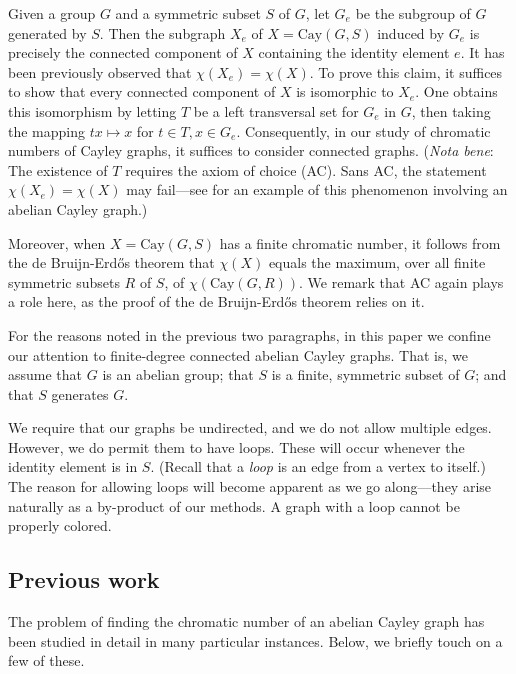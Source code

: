 \documentclass{article}
\theoremstyle{definition}
\theoremstyle{remark}
\begin{document}
Given a group $G$ and a symmetric subset $S$ of $G$, let $G_e$ be the subgroup of $G$ generated by $S$.  Then the subgraph $X_e$ of $X=\text{Cay}(G,S)$ induced by $G_e$ is precisely the connected component of $X$ containing the identity element $e$.  It has been previously observed that $\chi(X_e)=\chi(X)$.  To prove this claim, it suffices to show that every connected component of $X$ is isomorphic to $X_e$.  One obtains this isomorphism by letting $T$ be a left transversal set for $G_e$ in $G$, then taking the mapping $tx\mapsto x$ for $t\in T, x\in G_e$.  Consequently, in our study of chromatic numbers of Cayley graphs, it suffices to consider connected graphs.  (\emph{Nota bene}: The existence of $T$ requires the axiom of choice (AC).  Sans AC, the statement $\chi(X_e)=\chi(X)$ may fail---see \cite{Shelah-Soifer} for an example of this phenomenon involving an abelian Cayley graph.)

Moreover, when $X=\text{Cay}(G,S)$ has a finite chromatic number, it follows from the de Bruijn-Erd\H{o}s theorem \cite{de-Bruijn-Erdos} that $\chi(X)$ equals the maximum, over all finite symmetric subsets $R$ of $S$, of $\chi(\text{Cay}(G,R))$.  We remark that AC again plays a role here, as the proof of the de Bruijn-Erd\H{o}s theorem relies on it.

For the reasons noted in the previous two paragraphs, in this paper we confine our attention to finite-degree connected abelian Cayley graphs.  That is, we assume that $G$ is an abelian group; that $S$ is a finite, symmetric subset of $G$; and that $S$ generates $G$.

\vspace{.1in}

We require that our graphs be undirected, and we do not allow multiple edges.  However, we do permit them to have loops.  These will occur whenever the identity element is in $S$.  (Recall that a \emph{loop} is an edge from a vertex to itself.)  The reason for allowing loops will become apparent as we go along---they arise naturally as a by-product of our methods.  A graph with a loop cannot be properly colored.

\subsection{Previous work}

The problem of finding the chromatic number of an abelian Cayley graph has been studied in detail in many particular instances.  Below, we briefly touch on a few of these.
\end{document}
